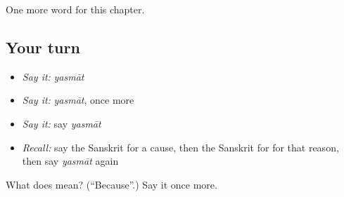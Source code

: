 \begin{grammarlens}[title={What you've built}]
One more word for this chapter.
\end{grammarlens}

\subsection*{Your turn}
\begin{itemize}
\raggedright
  \item \emph{Say it:} \emph{yasmāt}
  \item \emph{Say it:} \emph{yasmāt}, once more
  \item \emph{Say it:} say \emph{yasmāt}
  \item \emph{Recall:} say the Sanskrit for a cause, then the Sanskrit for for that reason, then say \emph{yasmāt} again
\end{itemize}

\begin{tcolorbox}[breakable,colback=teal!4,colframe=teal!35!black,title={Before you move on}]
What does  mean? (\textquotedblleft{}Because\textquotedblright{}.) Say it once more.
\end{tcolorbox}
